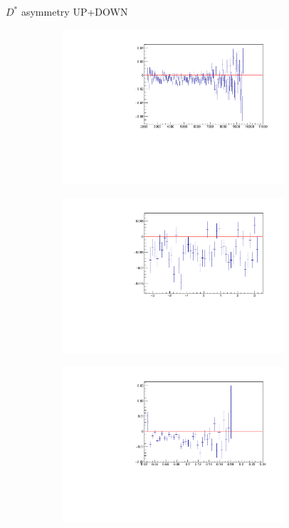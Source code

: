 \documentclass[11pt]{beamer}
\begin{document}
\begin{frame}{$D^*$ asymmetry UP+DOWN}
\begin{figure}
\begin{subfigure}{0.45\textwidth}
\includegraphics[width=0.9\textwidth]{up_down_pdf/deviation/h_pT_reco_Dst_pos_dev.pdf}
\end{subfigure}
\begin{subfigure}{0.45\textwidth}
\includegraphics[width=0.9\textwidth]{up_down_pdf/deviation/h_phi_reco_Dst_pos_dev.pdf}
\end{subfigure}
\begin{subfigure}{0.45\textwidth}
\includegraphics[width=0.9\textwidth]{up_down_pdf/deviation/h_theta_reco_Dst_pos_dev.pdf}

\end{subfigure}
\end{figure}
\end{frame}
\end{document}
